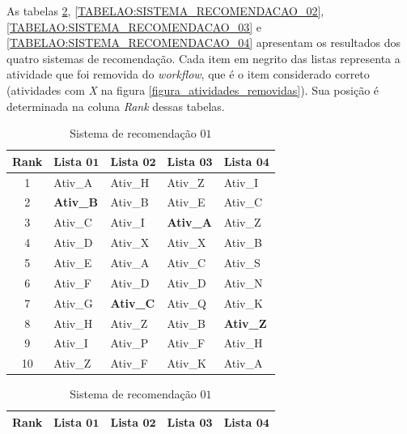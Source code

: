 As tabelas \ref{TABELAO:SISTEMA_RECOMENDACAO_01}, \ref{TABELAO:SISTEMA_RECOMENDACAO_02}, \ref{TABELAO:SISTEMA_RECOMENDACAO_03} e \ref{TABELAO:SISTEMA_RECOMENDACAO_04} apresentam os resultados dos quatro sistemas de recomendação. Cada item em negrito das listas representa a atividade que foi removida do \emph{workflow}, que é o item considerado correto (atividades com \emph{X} na figura \ref{figura_atividades_removidas}). Sua posição é determinada na coluna \emph{Rank} dessas tabelas.
\begin{table}[!htb]
	\tiny
	\caption{Exemplo de sistemas de recomendações de atividades}
	\begin{subtable}{.5\linewidth}
		\centering
		\begin{tabular}{|c|l|l|l|l|} \hline 
			\textbf{Rank} & \textbf{Lista} \(\mathbf{01}\) & \textbf{Lista} \(\mathbf{02}\) & \textbf{Lista} \(\mathbf{03}\) & \textbf{Lista} \(\mathbf{04}\) \\ \hline 
			1                & Ativ\_A	     		& Ativ\_H    			& Ativ\_Z   		& Ativ\_I    		\\
			2                & \textbf{Ativ\_B}		& Ativ\_B   			& Ativ\_E   		& Ativ\_C 			\\
			3                & Ativ\_C    			& Ativ\_I    			& \textbf{Ativ\_A}  & Ativ\_Z  			\\
			4                & Ativ\_D   			& Ativ\_X    			& Ativ\_X    		& Ativ\_B			\\
			5                & Ativ\_E   			& Ativ\_A			 	& Ativ\_C    		& Ativ\_S			\\
			6                & Ativ\_F   			& Ativ\_D    			& Ativ\_D    		& Ativ\_N			\\
			7                & Ativ\_G   			& \textbf{Ativ\_C}  	& Ativ\_Q    		& Ativ\_K			\\
			8                & Ativ\_H   			& Ativ\_Z    			& Ativ\_B   		& \textbf{Ativ\_Z}	\\
			9                & Ativ\_I    			& Ativ\_P   			& Ativ\_F   		& Ativ\_H			\\
			10               & Ativ\_Z   			& Ativ\_F    			& Ativ\_K    		& Ativ\_A			\\ \hline
		\end{tabular}
		\caption{Sistema de recomendação \(01\)}   
		\label{TABELAO:SISTEMA_RECOMENDACAO_01}		
	\end{subtable}%
	\begin{subtable}{.5\linewidth}
		\centering
		\begin{tabular}{|c|l|l|l|l|} \hline 
			\textbf{Rank} & \textbf{Lista} \(\mathbf{01}\) & \textbf{Lista} \(\mathbf{02}\) & \textbf{Lista} \(\mathbf{03}\) & \textbf{Lista} \(\mathbf{04}\) \\ \hline 

\end{tabular}
\end{subtable}
\end{table}
